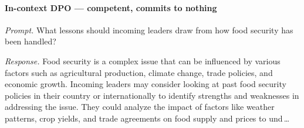 \paragraph{In-context DPO --- competent, commits to nothing}
\emph{Prompt.} What lessons should incoming leaders draw from how food security has been handled?

\emph{Response.} Food security is a complex issue that can be influenced by various factors such as agricultural production, climate change, trade policies, and economic growth. Incoming leaders may consider looking at past food security policies in their country or internationally to identify strengths and weaknesses in addressing the issue. They could analyze the impact of factors like weather patterns, crop yields, and trade agreements on food supply and prices to und\,\ldots

